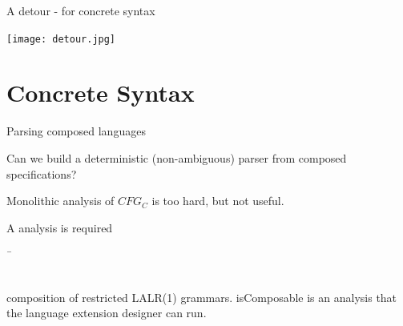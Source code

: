 \documentclass[notes,11pt,aspectratio=169]{beamer}
\newcommand{\eblue}[1]{{\usebeamercolor[fg]{bluecolor}#1}}
\begin{document}

\begin{frame}{A detour - for concrete syntax}

\texttt{[image: detour.jpg]}

\end{frame}


\section{Concrete Syntax}

 

\begin{frame}{Parsing composed languages}

Can we build a deterministic (non-ambiguous) parser from composed
specifications? 

\vskip 0.25cm
\bis{0.3cm}

 \x Monolithic analysis of $CFG_C$ is too hard, but not useful.

 \pause

 \x A  analysis is required %

 \x 
{\large
\begin{tabbing}
  \ \= 
     \\
 \>    \\

\end{tabbing}
}


  composition of restricted LALR(1) grammars.
 \eblue{isComposable} is an analysis that the language extension
          designer can run. 
\ei
\end{frame}
\end{document}

